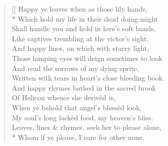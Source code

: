 \documentclass[MAIN]{subfiles}
\begin{document}
\settowidth{\versewidth}{Leaves, lines, and rymes, seeke her to please alone,}
\begin{verse}[\versewidth]
Happy ye leaves when as those lily hands,\\*
\vin Which hold my life in their dead doing might\\
Shall handle you and hold in love's soft bands,\\
\vin Like captives trembling at the victor's sight.\\
\vin And happy lines, on which with starry light,\\
\vin \vin Those lamping eyes will deign sometimes to look\\
\vin And read the sorrows of my dying sprite,\\
\vin \vin Written with tears in heart's close bleeding book.\\
And happy rhymes bathed in the sacred brook\\
\vin Of {\sc Helicon} whence she deriv\`ed is,\\
When ye behold that angel's bless\`ed look,\\
\vin My soul's long lack\`ed food, my heaven's bliss.\\
Leaves, lines \& rhymes, seek her to please alone,\\*
Whom if ye please, I care for other none.
\end{verse}
\end{document}
